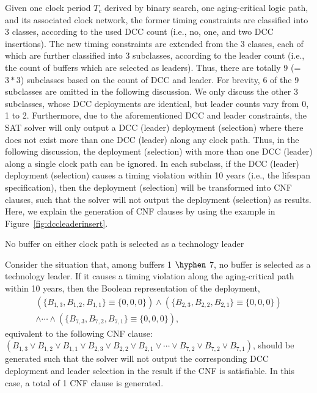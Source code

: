 Given one clock period $T_c$ derived by binary search, one aging-critical logic path, and its associated clock network, the former timing constraints are classified into 3 classes, according to the used DCC count (i.e., no, one, and two DCC insertions). The new timing constraints are extended from the 3 classes, each of which are further classified into 3 subclasses, according to the leader count (i.e., the count of buffers which are selected as leaders). Thus, there are totally 9 (= $3*3$) subclasses based on the count of DCC and leader. For brevity, 6 of the 9 subclasses are omitted in the following discussion. We only discuss the other 3 subclasses, whose DCC deployments are identical, but leader counts vary from 0, 1 to 2. Furthermore, due to the aforementioned DCC and leader constraints, the SAT solver will only output a DCC (leader) deployment (selection) where there does not exist more than one DCC (leader) along any clock path. Thus, in the following discussion, the deployment (selection) with more than one DCC (leader) along a single clock path can be ignored. In each subclass, if the DCC (leader) deployment (selection) causes a timing violation within 10 years (i.e., the lifespan specification), then the deployment (selection) will be transformed into CNF clauses, such that the solver will not output the deployment (selection) as results. Here, we explain the generation of CNF clauses by using the example in Figure~\ref{fig:dccleaderinsert}.

\setcounter{class}{0}
\begin{class}
\label{class:c4}
No buffer on either clock path is selected as a technology leader

Consider the situation that, among buffers 1 $\hyphen$ 7, no buffer is selected as a technology leader. If it causes a timing violation along the aging-critical path within 10 years, then the Boolean representation of the deployment,{\fontsize{8}{8.4}
\begin{gather*}
\left(\{B_{1,3}, B_{1,2}, B_{1,1}\} \equiv \{0, 0, 0\} \right) 
\land \left( \{B_{2,3}, B_{2,2}, B_{2,1}\} \equiv \{0, 0, 0\} \right) \\ \land \dotsb 
\land \left( \{B_{7,3}, B_{7,2}, B_{7,1}\} \equiv \{0, 0, 0\} \right),
\end{gather*}}
equivalent to the following CNF clause:
{\fontsize{8}{8.4}$(B_{1,3} \lor B_{1,2} \lor B_{1,1} \lor B_{2,3} \lor B_{2,2} \lor B_{2,1} \lor \dotsb \lor B_{7,2} \lor B_{7,2} \lor B_{7,1} )$,}
should be generated such that the solver will not output the corresponding DCC deployment and leader selection in the result if the CNF is satisfiable. In this case, a total of 1 CNF clause is generated.
\end{class}

